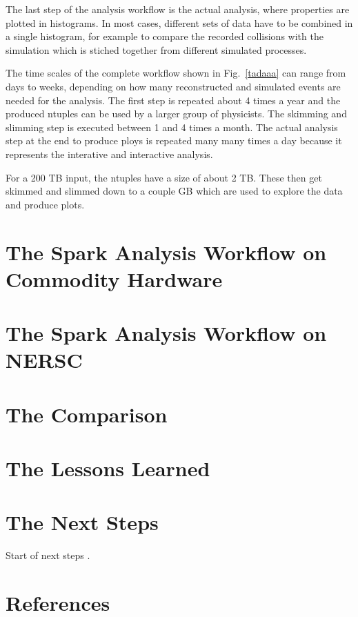 \documentclass[a4paper]{jpconf}
\begin{document}
The last step of the analysis workflow is the actual analysis, where properties are plotted in histograms. In most cases, different sets of data have to be combined in a single histogram, for example to compare the recorded collisions with the simulation which is stiched together from different simulated processes.

The time scales of the complete workflow shown in Fig.~\ref{tadaaa} can range from days to weeks, depending on how many reconstructed and simulated events are needed for the analysis. The first step is repeated about 4 times a year and the produced ntuples can be used by a larger group of physicists. The skimming and slimming step is executed between 1 and 4 times a month. The actual analysis step at the end to produce ploys is repeated many many times a day because it represents the interative and interactive analysis.

For a 200 TB input, the ntuples have a size of about 2 TB. These then get skimmed and slimmed down to a couple GB which are used to explore the data and produce plots.

\section{The Spark Analysis Workflow on Commodity Hardware}

\section{The Spark Analysis Workflow on NERSC}

\section{The Comparison}

\section{The Lessons Learned}

\section{The Next Steps}
Start of next steps \cite{ex1}.

\section*{References}

\end{document}
